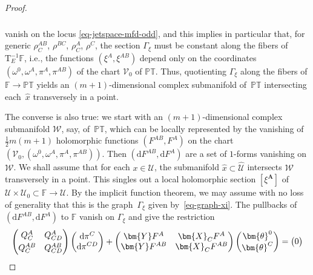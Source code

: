 \documentclass[10pt,a4paper]{amsart}
\numberwithin{equation}{section}
\newcommand{\mbf} [1]{\mathbf{#1}}
\newcommand{\mc} [1]{\mathcal{#1}}
\newcommand{\dd} {\mathrm{d}}
\newcommand{\Tgt} {\mathrm{T}}
\newcommand{\PT} {\mathbb{PT}}
\newcommand{\F} {\mathbb{F}}
\begin{document}
\begin{proof}
\begin{gather}
\begin{split}
\end{split}\label{eq-contact-odd}
\end{gather}
vanish on the locus \eqref{eq-jetspace-mfd-odd}, and this implies in particular that, for generic $\rho_{C}^{AB}$, $\rho^{BC}$, $\rho_{C}^{A}$, $\rho^{C}$, the section $\Gamma_\xi$ must be constant along the f\/ibers of $\Tgt^{-1}_E \F$, i.e., the functions $(\xi^A,\xi^{AB})$ depend only on the coordinates $(\omega^0, \omega^A,\pi^A,\pi^{AB})$ of the chart $\mc{V}_0$ of $\PT$. Thus, quotienting $\Gamma_\xi$ along the f\/ibers of $\F \rightarrow \PT$ yields an $(m+1)$-dimensional complex submanifold of~$\PT$ intersecting each~$\hat{x}$ transversely in a point.

The converse is also true: we start with an $(m+1)$-dimensional complex submanifold $\mc{W}$, say, of~$\PT$, which can be locally represented by the vanishing of $\frac{1}{2}m(m+1)$ holomorphic functions $(F^{AB} , F^{A})$ on the chart $(\mc{V}_0, (\omega^0, \omega^A,\pi^A,\pi^{AB}))$. Then $(\dd F^{AB} , \dd F^{A})$ are a set of $1$-forms vanishing on $\mc{W}$. We shall assume that for each $x \in \mc{U}$, the submanifold $\hat{x} \subset \widehat{\mc{U}}$ intersects $\mc{W}$ transversely in a point. This singles out a local holomorphic section $[\xi^{\mbf{A}}]$ of $\mc{U} \times \mc{U}_0 \subset \F \rightarrow \mc{U}$. By the implicit function theorem, we may assume with no loss of generality that this is the graph~$\Gamma_\xi$ given by~\eqref{eq-graph-xi}. The pullbacks of $(\dd F^{AB} , \dd F^{A})$ to $\F$ vanish on $\Gamma_\xi$ and give the restriction
\begin{gather}\label{eq-pullbackF}
\begin{pmatrix}
Q_C^A & Q_{CD}^A \vspace{1mm}\\
Q_C^{AB} & Q_{CD}^{AB}
\end{pmatrix}
\begin{pmatrix}
\dd \pi^{C} \\
\dd \pi^{CD}
\end{pmatrix}
+
\begin{pmatrix}
\bm{Y} F^{A} & \bm{X}_C F^{A} \\
\bm{Y} F^{AB} & \bm{X}_C F^{AB}
\end{pmatrix}
\begin{pmatrix}
\bm{\theta}^0 \\
\bm{\theta}^C
\end{pmatrix} =
\begin{pmatrix}
0 \\

\end{pmatrix}
\end{gather}
\end{proof}
\end{document}
